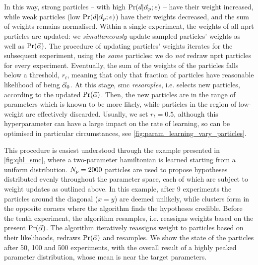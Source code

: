 In this way, strong \glspl{particle} -- with high $\Pr(d | \vec{\alpha}_p; e)$ -- have their weight increased, 
while weak \glspl{particle} (low $\Pr(d | \vec{\alpha}_p; e)$) have their weights decreased, 
and the sum of weights remains normalised. 
Within a single experiment, the weights of all \gls{nprt} \glspl{particle} are updated:
we \emph{simultaneously} update sampled \glspl{particle}' weights as well as $\Pr(\vec{\alpha})$. 
The procedure of updating \glspl{particle}' weights iterates for the subsequent experiment, using the \emph{same} \glspl{particle}: 
we do \emph{not} redraw \gls{nprt} \glspl{particle} for every experiment.
Eventually, the sum of the weights of the \glspl{particle} falls below a threshold, $r_t$, 
meaning that only that fraction of \glspl{particle} have reasonable \gls{likelihood} of being $\vec{\alpha}_0$.
At this stage, \gls{smc} \emph{resamples}\footnotemark, i.e. selects new \glspl{particle}, according to the updated $\Pr(\vec{\alpha})$.
Then, the new \glspl{particle} are in the range of parameters which is known to be more likely, 
while \glspl{particle} in the region of low-weight are effectively discarded. 
Usually, we set $r_t=0.5$, although this \gls{hyperparameter} can have a large impact 
on the rate of learning, so can be optimised in particular circumstances, 
see \cref{fig:param_learning_vary_particles}.
\par 
This procedure is easiest understood through the example presented in \cref{fig:qhl_smc}, 
where a two-parameter \gls{hamiltonian} is learned starting from a uniform distribution. 
$N_p=2000$ \glspl{particle} are used to propose hypotheses distributed evenly throughout the parameter space, 
each of which are subject to weight updates as outlined above. 
In this example, after 9 \glspl{experiment} the \glspl{particle} around the diagonal ($x=y$) are deemed unlikely, 
while clusters form in the opposite corners where the algorithm finds the hypotheses credible. 
Before the tenth experiment, the algorithm resamples, i.e. reassigns weights based on the present $\Pr(\vec{\alpha})$. 
The algorithm iteratively reassigns weight to \glspl{particle} based on their likelihoods, redraws $\Pr(\vec{\alpha})$ and resamples. 
We show the state of the \glspl{particle} after 50, 100 and 500 \glspl{experiment},
with the overall result of a highly peaked parameter distribution, 
whose mean is near the target parameters. 



